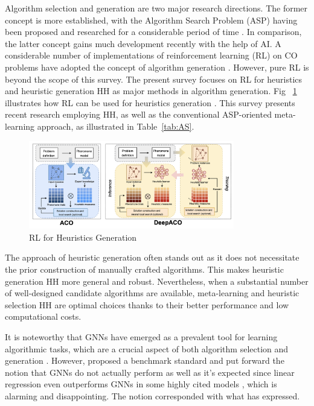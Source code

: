 \documentclass[a4paper]{article}
\begin{document}
Algorithm selection and generation are two major research directions. The former concept is more established, with the Algorithm Search Problem (ASP) having been proposed and researched for a considerable period of time \citep{Maryam} . In comparison, the latter concept gains much development recently with the help of AI. A considerable number of implementations of reinforcement learning (RL) on CO problems have adopted the concept of algorithm generation \citep{Nina}. However, pure RL is beyond the scope of this survey. The present survey focuses on RL for heuristics and heuristic generation HH as major methods in algorithm generation. Fig ~\ref{fig:rl_ag} illustrates how RL can be used for heuristics generation \citep{Haoran}. This survey presents recent research employing HH, as well as the conventional ASP-oriented meta-learning approach, as illustrated in Table~\ref{tab:AS}.

\begin{figure}[h]
\centering
\includegraphics[width=0.8\textwidth]{figures/RL for Algorithm Generation.png}
    \caption{\label{fig:rl_ag}RL for Heuristics Generation}
\end{figure}

The approach of heuristic generation often stands out as it does not necessitate the prior construction of manually crafted algorithms.  \citep{Edmund} This makes heuristic generation HH more general and robust. Nevertheless, when a substantial number of well-designed candidate algorithms are available, meta-learning and heuristic selection HH are optimal choices thanks to their better performance and low computational costs.

It is noteworthy that GNNs have emerged as a prevalent tool for learning algorithmic tasks, which are a crucial aspect of both algorithm selection and generation \citep{Khalil,Shen}. However, \citet{Ankur} proposed a benchmark standard and put forward the notion that GNNs do not actually perform as well as it's expected since linear regression even outperforms GNNs in some highly cited models \citep{Khalil}, which is alarming and disappointing. The notion corresponded with what \citet{Angelini} has expressed.
\end{document}
